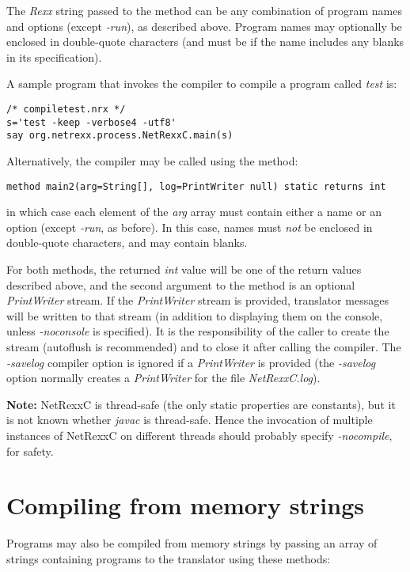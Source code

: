 {The \emph{Rexx} string passed to the method can be any combination of
program names and options (except \emph{-run}), as described above.
Program names may optionally be enclosed in double-quote characters (and
must be if the name includes any blanks in its specification).

A sample \nr{}program that invokes the \nr{}compiler to compile a
program called \emph{test} is:
\begin{lstlisting}[label=compiletest,caption=Compiletest]
/* compiletest.nrx */
s='test -keep -verbose4 -utf8'
say org.netrexx.process.NetRexxC.main(s)
\end{lstlisting}

Alternatively, the compiler may be called using the method:
\begin{lstlisting}[label=array,caption=Calling with Array argument]
method main2(arg=String[], log=PrintWriter null) static returns int
\end{lstlisting}
in which case each element of the \emph{arg} array must contain
either a name or an option (except \emph{-run}, as before).  In this
case, names must \emph{not} be enclosed in double-quote characters, and
may contain blanks.

For both methods, the returned \emph{int} value will be one of the
return values described above, and the second argument to the method is
an optional \emph{PrintWriter} stream.  If the \emph{PrintWriter} stream
is provided, translator messages will be written to that stream (in
addition to displaying them on the console, unless \emph{-noconsole} is
specified).
It is the responsibility of the caller to create the stream (autoflush
is recommended) and to close it after calling the compiler.
The \emph{-savelog} compiler option is ignored if a \emph{PrintWriter}
is provided (the \emph{-savelog} option normally creates
a \emph{PrintWriter} for the file \emph{NetRexxC.log}).

\textbf{Note:} NetRexxC is thread-safe (the only static properties are constants), but
it is not known whether \emph{javac} is thread-safe.  Hence the
invocation of multiple instances of NetRexxC on different threads should
probably specify \emph{-nocompile}, for safety.

\section{Compiling from memory strings}
Programs may also be compiled from memory strings by passing an array
of strings containing programs to the translator using these methods:

}
